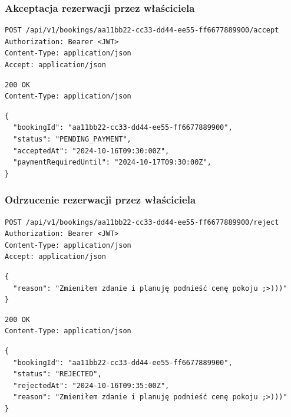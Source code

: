 \documentclass[11pt, a4paper]{article}
\begin{document}
\subsubsection{Akceptacja rezerwacji przez właściciela}

\begin{lstlisting}[style=http,caption={Żądanie HTTP — akceptacja rezerwacji}]
POST /api/v1/bookings/aa11bb22-cc33-dd44-ee55-ff6677889900/accept
Authorization: Bearer <JWT>
Content-Type: application/json
Accept: application/json
\end{lstlisting}

\begin{lstlisting}[style=http,caption={Odpowiedź HTTP — akceptacja rezerwacji, sukces}]
200 OK
Content-Type: application/json
\end{lstlisting}

\begin{lstlisting}[style=json,caption={Ciało odpowiedzi — akceptacja rezerwacji, sukces}]
{
  "bookingId": "aa11bb22-cc33-dd44-ee55-ff6677889900",
  "status": "PENDING_PAYMENT",
  "acceptedAt": "2024-10-16T09:30:00Z",
  "paymentRequiredUntil": "2024-10-17T09:30:00Z",
}
\end{lstlisting}

\subsubsection{Odrzucenie rezerwacji przez właściciela}

\begin{lstlisting}[style=http,caption={Żądanie HTTP — odrzucenie rezerwacji}]
POST /api/v1/bookings/aa11bb22-cc33-dd44-ee55-ff6677889900/reject
Authorization: Bearer <JWT>
Content-Type: application/json
Accept: application/json
\end{lstlisting}

\begin{lstlisting}[style=json,caption={Ciało żądania — odrzucenie rezerwacji}]
{
  "reason": "Zmieniłem zdanie i planuję podnieść cenę pokoju ;>)))"
}
\end{lstlisting}

\begin{lstlisting}[style=http,caption={Odpowiedź HTTP — odrzucenie rezerwacji, sukces}]
200 OK
Content-Type: application/json
\end{lstlisting}

\begin{lstlisting}[style=json,caption={Ciało odpowiedzi — odrzucenie rezerwacji, sukces}]
{
  "bookingId": "aa11bb22-cc33-dd44-ee55-ff6677889900",
  "status": "REJECTED",
  "rejectedAt": "2024-10-16T09:35:00Z",
  "reason": "Zmieniłem zdanie i planuję podnieść cenę pokoju ;>)))"
}
\end{lstlisting}
\end{document}
